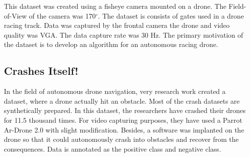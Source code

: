 This dataset was created using a fisheye camera mounted on a drone. The Field-of-View of the camera was 170$^{\circ}$. The dataset is consists of gates used in a drone racing track. Data was captured by the frontal camera the drone and video quality was VGA. The data capture rate was 30 Hz. The primary motivation of the dataset is to develop an algorithm for an autonomous racing drone.


\subsection{Crashes Itself!}

In the field of autonomous drone navigation, very research work created a dataset, where a drone actually hit an obstacle. Most of the crash datasets are synthetically prepared. In this dataset, the researchers have crashed their drones for 11.5 thousand times. For video capturing purposes, they have used a Parrot Ar-Drone 2.0 with slight modification. Besides, a software was implanted on the drone so that it could autonomously crash into obstacles and recover from the consequences. Data is annotated as the positive class and negative class.